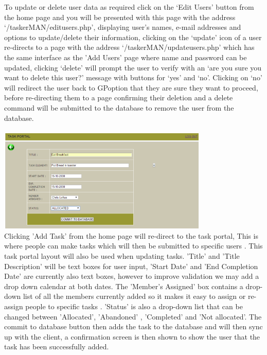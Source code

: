 \documentclass{project}
\begin{document}
To update or delete user data as required \cite{se.qa.rs} click on the `Edit Users' button from the home page and you will be presented with this page with the address `/taskerMAN/editusers.php', displaying user's names, e-mail addresses and options to update/delete their information, clicking on the `update' icon of a user re-directs to a page with the address `/taskerMAN/updateusers.php' which has the same interface as the 'Add Users' page where name and password can be updated, clicking `delete' will prompt the user to verify with an `are you sure you want to delete this user?' message with buttons for `yes' and `no'. Clicking on `no' will redirect the user back to GPoption that they are sure they want to proceed, before re-directing them to a page confirming their deletion and a delete command will be submitted to the database to remove the user from the database. \\~\\\includegraphics[width=0.75\textwidth, center]{images/5.2/TaskerMANAddTask} \\
Clicking 'Add Task' from the home page will re-direct to the task portal, This is where people can make tasks which will then be submitted to specific users \cite{se.qa.rs fr4}. This task portal layout will also be used when updating tasks. 'Title' and 'Title Description' will be text boxes for user input, 'Start Date' and 'End Completion Date' are currently also text boxes, however to improve validation we may add a drop down calendar at both dates. The 'Member's Assigned' box contains a drop-down list of all the members currently added so it makes it easy to assign or re-assign people to specific tasks \cite{se.qa.rs fr5}. 'Status' is also a drop-down list that can be changed between 'Allocated', 'Abandoned' \cite{se.qa.rs fr6}, 'Completed' and 'Not allocated'. The commit to database button then adds the task to the database and will then sync up with the client, a confirmation screen is then shown to show the user that the task has been successfully added. \\~\\
\end{document}
